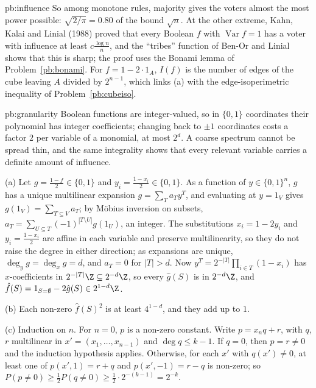 \begin{solution}{pb:influence}
\leads So among monotone rules, majority gives the voters almost the most power possible: $\sqrt{2/\pi}=0.80$ of the bound $\sqrt n$. At the
other extreme, Kahn, Kalai and Linial (1988) proved that every Boolean $f$ with $\operatorname{Var}f=1$ has a voter with influence at least $c\frac{\log n}n$,
and the ``tribes'' function of Ben-Or and Linial shows that this is sharp; the proof uses the Bonami lemma of Problem~\ref{pb:bonami}.
For $f=1-2\cdot1_A$, $I(f)$ is the number of edges of the cube leaving $A$ divided by $2^{n-1}$, which links (a) with the edge-isoperimetric
inequality of Problem~\ref{pb:cubeiso}.
\end{solution}

\begin{solution}{pb:granularity}
\idea Boolean functions are integer-valued, so in $\{0,1\}$ coordinates their polynomial has integer coefficients; changing back to
$\pm1$ coordinates costs a factor $2$ per variable of a monomial, at most $2^d$. A coarse spectrum cannot be spread thin, and the
same integrality shows that every relevant variable carries a definite amount of influence.

\writeup (a) Let $g=\frac{1-f}2\in\{0,1\}$ and $y_i=\frac{1-x_i}2\in\{0,1\}$. As a function of $y\in\{0,1\}^n$, $g$ has a unique multilinear expansion
$g=\sum_Ta_Ty^T$, and evaluating at $y=1_V$ gives $g(1_V)=\sum_{T\subseteq V}a_T$; by Möbius inversion on subsets, $a_T=\sum_{U\subseteq T}(-1)^{|T\setminus U|}g(1_U)$,
an integer. The substitutions $x_i=1-2y_i$ and $y_i=\frac{1-x_i}2$ are affine in each variable and preserve multilinearity, so they do not
raise the degree in either direction; as expansions are unique, $\deg_yg=\deg_xg=d$, and $a_T=0$ for $|T|>d$. Now
$y^T=2^{-|T|}\prod_{i\in T}(1-x_i)$ has $x$-coefficients in $2^{-|T|}\Z\subseteq2^{-d}\Z$, so every $\hat g(S)$ is in $2^{-d}\Z$, and $\hat f(S)=1_{S=\emptyset}-2\hat g(S)\in2^{1-d}\Z$.

(b) Each non-zero $\hat f(S)^2$ is at least $4^{1-d}$, and they add up to $1$.

(c) Induction on $n$. For $n=0$, $p$ is a non-zero constant. Write $p=x_nq+r$, with $q$, $r$ multilinear in $x'=(x_1,\dots,x_{n-1})$ and
$\deg q\le k-1$. If $q=0$, then $p=r\ne0$ and the induction hypothesis applies. Otherwise, for each $x'$ with $q(x')\ne0$, at least one
of $p(x',1)=r+q$ and $p(x',-1)=r-q$ is non-zero; so $P(p\ne0)\ge\frac12P(q\ne0)\ge\frac12\cdot2^{-(k-1)}=2^{-k}$.


\end{solution}
